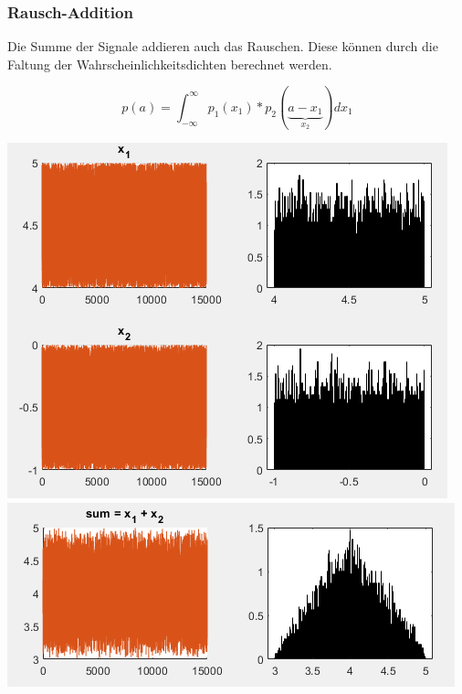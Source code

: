 \subsubsection{Rausch-Addition}
Die Summe der Signale addieren auch das Rauschen. Diese können durch die Faltung der Wahrscheinlichkeitsdichten berechnet werden.

\[
p(a) = \int_{-\infty}^{\infty}p_1(x_1)*p_2(\underbrace{a - x_1}_{x_2})dx_1
\]

\begin{center}
	\noindent \includegraphics[width=0.7\columnwidth]{Images/rauschen_example1}
\noindent \includegraphics[width=0.7\columnwidth]{Images/rauschen_example2}
\end{center}


